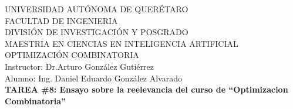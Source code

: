 \begin{center}

UNIVERSIDAD AUTÓNOMA DE QUERÉTARO \\
FACULTAD DE INGENIERIA \\
DIVISIÓN DE INVESTIGACIÓN Y POSGRADO \\
MAESTRIA EN CIENCIAS EN INTELIGENCIA ARTIFICIAL \\

OPTIMIZACIÓN COMBINATORIA \\[0.3cm]

Instructor: Dr.Arturo González Gutiérrez \\
Alumno: Ing. Daniel Eduardo González Alvarado \\%

\textbf{TAREA \#8: Ensayo sobre la reelevancia del curso de ``Optimizacion Combinatoria''}\\


\end{center}